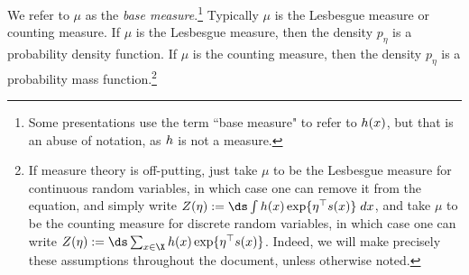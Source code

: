 \begin{definition}
We refer to $\mu$ as the \textit{base measure}.\footnote{Some presentations use the term ``base measure" to refer to $h(x)$, but that is an abuse of notation, as $h$ is not a measure.}  Typically $\mu$ is the Lesbesgue measure or counting measure.  If $\mu$ is the Lesbesgue measure, then the density $p_\eta$ is a probability density function.  If $\mu$ is the counting measure, then the density $p_\eta$ is a probability mass function.\footnote{If measure theory is off-putting, just take $\mu$ to be the Lesbesgue measure for continuous random variables, in which case one can remove it from the equation, and simply write $\normalizerFunction(\eta) := \ds\int  \carrierDensity(x) \exp \{ \eta^\top \sufficientStatsFunction (x)  \} \; dx $, and take $\mu$ to be the counting measure for discrete random variables, in which case one can write $\normalizerFunction(\eta) := \ds\sum_{x \in \X} \carrierDensity(x) \exp \{ \eta^\top \sufficientStatsFunction(x)  \} $. Indeed, we will make precisely these assumptions throughout the document, unless otherwise noted. }  %
\label{def:exponential_family}
\end{definition} 
